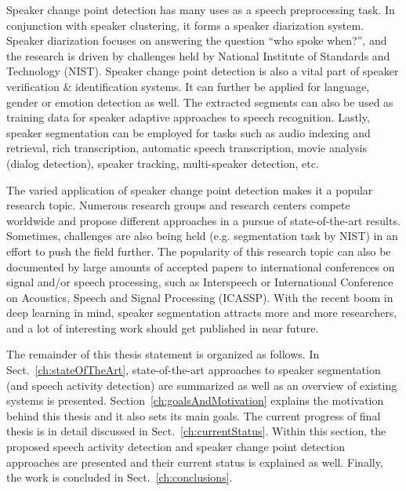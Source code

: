 \documentclass[FM,noheader,EN,bwtitles]{tulthesis}
\begin{document}
Speaker change point detection has many uses as a speech preprocessing task.
In conjunction with speaker clustering, it forms a speaker diarization system.
Speaker diarization focuses on answering the question “who spoke when?”, and the research is driven by challenges held by National Institute of Standards and Technology (NIST).
Speaker change point detection is also a vital part of speaker verification \& identification systems.
It can further be applied for language, gender or emotion detection as well.
The extracted segments can also be used as training data for speaker adaptive approaches to speech recognition.
Lastly, speaker segmentation can be employed for tasks such as audio indexing and retrieval, rich transcription, automatic speech transcription, movie analysis (dialog detection), speaker tracking, multi-speaker detection, etc.

The varied application of speaker change point detection makes it a popular research topic.
Numerous research groups and research centers compete worldwide and propose different approaches in a pursue of state-of-the-art results.
Sometimes, challenges are also being held (e.g. segmentation task by NIST) in an effort to push the field further.
The popularity of this research topic can also be documented by large amounts of accepted papers to international conferences on signal and/or speech processing, such as Interspeech or International Conference on Acoustics, Speech and Signal Processing (ICASSP).
With the recent boom in deep learning in mind, speaker segmentation attracts more and more researchers, and a lot of interesting work should get published in near future.

The remainder of this thesis statement is organized as follows.
In Sect.~\ref{ch:stateOfTheArt}, state-of-the-art approaches to speaker segmentation (and speech activity detection) are summarized as well as an overview of existing systems is presented.
Section~\ref{ch:goalsAndMotivation} explains the motivation behind this thesis and it also sets its main goals.
The current progress of final thesis is in detail discussed in Sect.~\ref{ch:currentStatus}.
Within this section, the proposed speech activity detection and speaker change point detection approaches are presented and their current status is explained as well.
Finally, the work is concluded in Sect.~\ref{ch:conclusions}.
\end{document}

